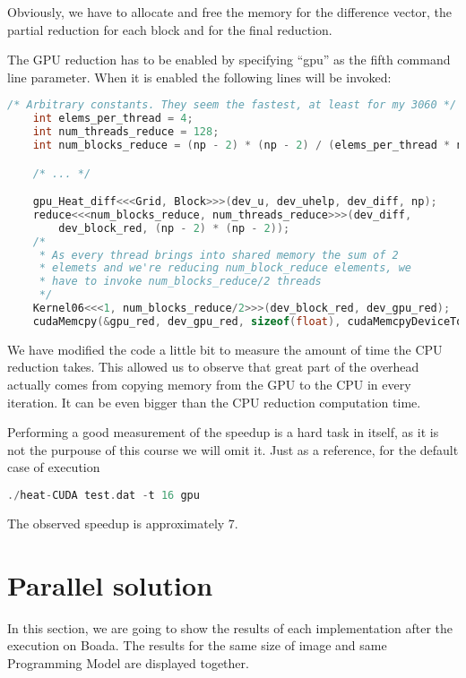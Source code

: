 \documentclass[a4paper, 10pt]{article}
\begin{document}
Obviously, we have to allocate and free the memory for the difference vector, the partial reduction for each block and for the final reduction.
\clearpage

The GPU reduction has to be enabled by specifying ``gpu'' as the fifth command line parameter. When it is enabled the following lines will be invoked:

\begin{lstlisting}[language=c, caption={Reduction}, label={lst:cudareduction_block}]
    /* Arbitrary constants. They seem the fastest, at least for my 3060 */
    int elems_per_thread = 4;
    int num_threads_reduce = 128;
    int num_blocks_reduce = (np - 2) * (np - 2) / (elems_per_thread * num_threads_reduce);

    /* ... */

    gpu_Heat_diff<<<Grid, Block>>>(dev_u, dev_uhelp, dev_diff, np);
    reduce<<<num_blocks_reduce, num_threads_reduce>>>(dev_diff, 
	    dev_block_red, (np - 2) * (np - 2));
    /* 
     * As every thread brings into shared memory the sum of 2 
     * elemets and we're reducing num_block_reduce elements, we
     * have to invoke num_blocks_reduce/2 threads
     */
    Kernel06<<<1, num_blocks_reduce/2>>>(dev_block_red, dev_gpu_red);
    cudaMemcpy(&gpu_red, dev_gpu_red, sizeof(float), cudaMemcpyDeviceToHost);
\end{lstlisting}

We have modified the code a little bit to measure the amount of time the CPU reduction takes. This allowed us to observe that great part of the overhead actually comes from copying memory from the GPU to the CPU in every iteration. It can be even bigger than the CPU reduction computation time. 

Performing a good measurement of the speedup is a hard task in itself, as it is not the purpouse of this course we will omit it. Just as a reference, for the default case of execution
\begin{lstlisting}[language=c]
./heat-CUDA test.dat -t 16 gpu
\end{lstlisting}

The observed speedup is approximately 7. 


\clearpage

\section{Parallel solution}
\label{sec:results}

In this section, we are going to show the results of each implementation after the execution on Boada. The results for the same size of image and same Programming Model are displayed together.
\end{document}
